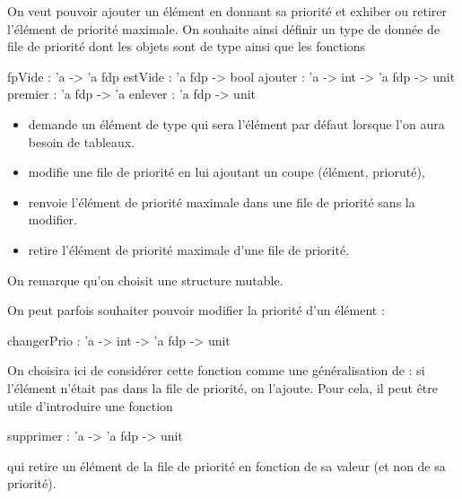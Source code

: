 On veut pouvoir ajouter un élément en donnant sa priorité et exhiber ou retirer l'élément de priorité maximale.
On souhaite ainsi définir un type de donnée  de file de priorité dont les objets sont de type  ainsi que les fonctions
\begin{ocaml}
fpVide : 'a -> 'a fdp 
estVide : 'a fdp -> bool 
ajouter : 'a  -> int -> 'a fdp -> unit
premier : 'a fdp -> 'a 
enlever : 'a fdp -> unit
\end{ocaml}
\begin{itemize}
\item {} demande un élément de type  qui sera l'élément par défaut lorsque l'on aura besoin de tableaux.

\item {} modifie une file de priorité en lui ajoutant un coupe (élément, prioruté),

\item {} renvoie l'élément de priorité maximale dans une file de priorité sans la modifier.

\item {} retire l'élément de priorité maximale d'une file de priorité.
\end{itemize}
On remarque qu'on choisit une structure mutable.

\medskip

On peut parfois souhaiter pouvoir modifier la priorité d'un élément :
\begin{ocaml}
changerPrio : 'a  -> int -> 'a fdp -> unit
\end{ocaml}
On choisira ici de considérer cette fonction comme une généralisation de  : si l'élément n'était pas dans la file de priorité, on l'ajoute.
Pour cela, il peut être utile d'introduire une fonction
\begin{ocaml}
supprimer : 'a  -> 'a fdp -> unit
\end{ocaml}
qui retire un élément de la file de priorité en fonction de sa valeur (et non de sa priorité).

